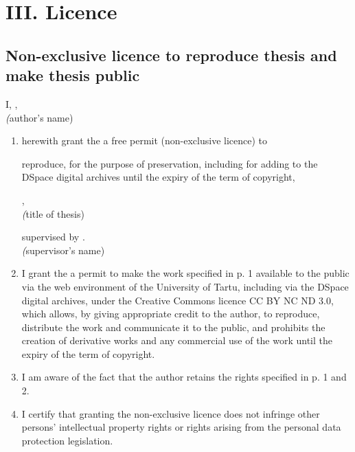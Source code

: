 
\newpage

\newcommand{\licencehint}[2]{\\\hspace*{#1}\textsl(#2)\par}

\section*{III. Licence}

\subsection*{Non-exclusive licence to reproduce thesis and make thesis public}

I, \textbf{{\thesisAuthor}}, %
\licencehint{10mm}{author's name}

\begin{enumerate}
  \item
  herewith grant the {\thesisUniversity} a free permit (non-exclusive licence) to
  \par
  reproduce, for the purpose of preservation, including for adding to the DSpace digital archives until the expiry of the term of copyright,
  \par
  \textbf{{\thesisTitle}}, %
  \licencehint{10mm}{title of thesis}
  \par
  supervised by {\thesisSupervisor}. %
  \licencehint{10mm}{supervisor's name}
  \item
  I grant the {\thesisUniversity} a permit to make the work specified in p. 1 available to the public via the web environment of the University of Tartu, including via the DSpace digital archives, under the Creative Commons licence CC BY NC ND 3.0, which allows, by giving appropriate credit to the author, to reproduce, distribute the work and communicate it to the public, and prohibits the creation of derivative works and any commercial use of the work until the expiry of the term of copyright.
  \item
  I am aware of the fact that the author retains the rights specified in p. 1 and 2.
  \item
  I certify that granting the non-exclusive licence does not infringe other persons' intellectual property rights or rights arising from the personal data protection legislation.
\end{enumerate}

\noindent
{\thesisAuthor}\\ %
\textbf{\textsl{{\todayDate}}}
